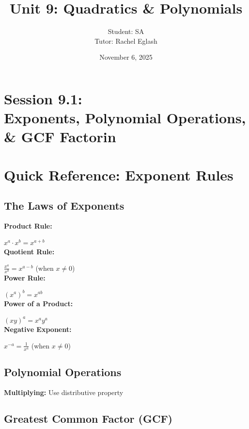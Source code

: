 \documentclass[12pt]{article}
\title{Unit 9: Quadratics \& Polynomials}
\author{
	Student: SA\\
	Tutor: Rachel Eglash}
\date{November 6, 2025}
\begin{document}
	
	\maketitle
    
    \newpage

	\section*{Session 9.1: \\ Exponents, Polynomial Operations, \& GCF Factorin}

	\section*{Quick Reference: Exponent Rules}

		\subsection*{The Laws of Exponents}

			\textbf{Product Rule:}
            
            $x^a \cdot x^b = x^{a+b}$\\

			\textbf{Quotient Rule:}
            
            $\frac{x^a}{x^b} = x^{a-b}$ (when $x \neq 0$)\\

			\textbf{Power Rule:}
            
            $(x^a)^b = x^{ab}$\\

			\textbf{Power of a Product:}
            
            $(xy)^a = x^a y^a$\\

			\textbf{Negative Exponent:}
            
            $x^{-a} = \frac{1}{x^a}$ (when $x \neq 0$)\\

		\subsection*{Polynomial Operations}

			\textbf{Multiplying:} Use distributive property

		\subsection*{Greatest Common Factor (GCF)}
\end{document}

